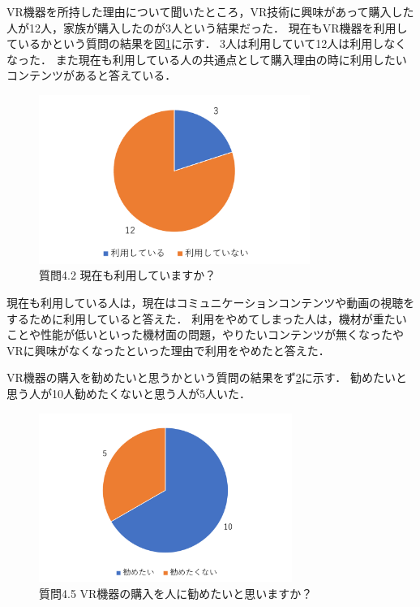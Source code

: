 \documentclass[12pt,a4j]{ltjsarticle}
\begin{document}
VR機器を所持した理由について聞いたところ，VR技術に興味があって購入した人が12人，家族が購入したのが3人という結果だった．
現在もVR機器を利用しているかという質問の結果を図\ref{fig:アンケート結果1_4_2.pdf}に示す．
3人は利用していて12人は利用しなくなった．
また現在も利用している人の共通点として購入理由の時に利用したいコンテンツがあると答えている．
\begin{figure}[h]
\begin{center}
 \includegraphics[clip,height=55mm]{アンケート結果1_4_2.pdf}
\end{center}
 \caption{質問4.2 現在も利用していますか？}
 \label{fig:アンケート結果1_4_2.pdf}
\end{figure}
現在も利用している人は，現在はコミュニケーションコンテンツや動画の視聴をするために利用していると答えた．
利用をやめてしまった人は，機材が重たいことや性能が低いといった機材面の問題，やりたいコンテンツが無くなったやVRに興味がなくなったといった理由で利用をやめたと答えた．

VR機器の購入を勧めたいと思うかという質問の結果をず\ref{fig:アンケート結果1_4_5.pdf}に示す．
勧めたいと思う人が10人勧めたくないと思う人が5人いた．
\begin{figure}[h]
\begin{center}
 \includegraphics[clip,height=55mm]{アンケート結果1_4_5.pdf}
\end{center}
 \caption{質問4.5 VR機器の購入を人に勧めたいと思いますか？}
 \label{fig:アンケート結果1_4_5.pdf}
\end{figure}
\end{document}
